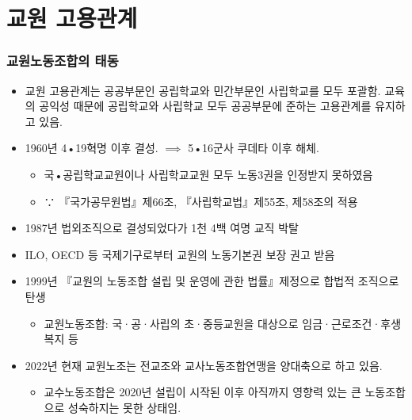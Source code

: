 \documentclass[aspectratio=169,xcolor=dvipsnames,handout]{beamer}
\begin{document}
\section{교원 고용관계}
\begin{frame}[allowframebreaks]
    \frametitle{교원노동조합의 태동}
    \begin{itemize}[<+->]
        \item 교원 고용관계는 공공부문인 공립학교와 민간부문인 사립학교를 모두 포괄함. 교육의 공익성 때문에 공립학교와 사립학교 모두 공공부문에 준하는 고용관계를 유지하고 있음.
        \item 1960년 4•19혁명 이후 결성. $\implies$ 5•16군사 쿠데타 이후 해체. 
        \begin{itemize}
            \item 국•공립학교교원이나 사립학교교원 모두 노동3권을 인정받지 못하였음
            \item ∵ 『국가공무원법』제66조, 『사립학교법』제55조, 제58조의 적용
        \end{itemize}
        \item 1987년 법외조직으로 결성되었다가 1천 4백 여명 교직 박탈
    \framebreak%
        \item ILO, OECD 등 국제기구로부터 교원의 노동기본권 보장 권고 받음
        \item 1999년 『교원의 노동조합 설립 및 운영에 관한 법률』제정으로 합법적 조직으로 탄생
        \begin{itemize}
            \item 교원노동조합: 국·공·사립의 초·중등교원을 대상으로 임금·근로조건·후생복지 등 
        \end{itemize}
        \item 2022년 현재 교원노조는 전교조와 교사노동조합연맹을 양대축으로 하고 있음.
        \begin{itemize}
            \item 교수노동조합은 2020년 설립이 시작된 이후 아직까지 영향력 있는 큰 노동조합으로 성숙하지는 못한 상태임.
        \end{itemize}
    \end{itemize}
\end{frame}
\end{document}
